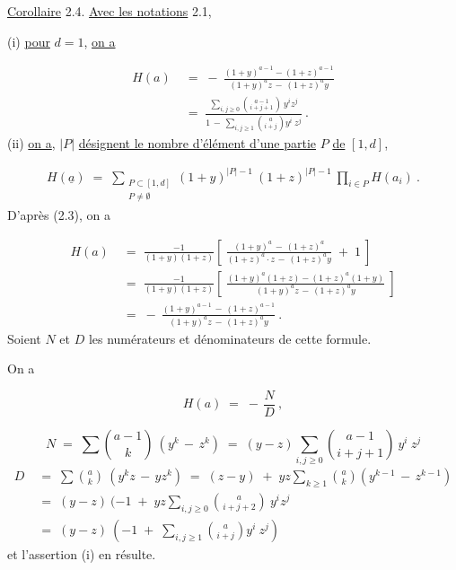 
\underline{Corollaire} 2.4. \underline{Avec les notations} 2.1,

(i) \quad \underline{pour} $d = 1$, \underline{on a}

\begin{equation*}
\begin{aligned}
H(a) \;&=\; -\ \frac{(1+y)^{a-1} - (1+z)^{a-1}}{(1+y)^{a}z \,-\, (1+z)^{a}y}\\[2ex]
&=\; \frac{\displaystyle\sum_{i,j\geq 0}\binom{a-1}{i+j+1}\ y^{i}z^{j}}{1 \,-\, \displaystyle\sum_{i,j\geq 1}\binom{a}{i+j}y^{i}\ z^{j}}\ .
\end{aligned}
\end{equation*}
(ii) \quad \underline{on a}, $|P|$ \underline{désignent le nombre d'élément d'une partie} $P$ \underline{de} $[1,d]$,

\begin{multline*}
H(\underline{a}) \;=\; \sum_{\substack{P \subset [1,d] \\ P \neq \emptyset}} (1+y)^{|P|-1}\ (1+z)^{|P|-1}\ \prod_{i \in P} H(a_{i})\ .
\end{multline*}
D'après (2.3), on a

\begin{equation*}
\begin{aligned}
H(a) \;&=\; \frac{-1}{(1+y)(1+z)}\left[\ \frac{(1+y)^{a} \,-\, (1+z)^{a}}{(1+z)^{a}\cdot z \,-\, (1+z)^{a}y} \;+\; 1\ \right]\\[2ex]
&=\; \frac{-1}{(1+y)(1+z)}\left[\ \frac{(1+y)^{a}(1+z)-(1+z)^{a}(1+y)}{(1+y)^{a}z \,-\, (1+z)^{a}y}\ \right]\\[2ex]
&=\; -\ \frac{(1+y)^{a-1} \,-\, (1+z)^{a-1}}{(1+y)^{a}z \,-\, (1+z)^{a}y}\ .
\end{aligned}
\end{equation*}
Soient $N$ et $D$ les numérateurs et dénominateurs de cette formule.

On a

\begin{equation*}
H(a) \;=\; -\,\frac{N}{D}\ , 
\end{equation*}


\begin{equation*}
 N \;=\; \sum \binom{a-1}{k}\ (y^{k} \,-\, z^{k}) \;=\; (y-z) \sum_{i,j\geq 0}\binom{a-1}{i+j+1}\ y^{i}\ z^{j}
\end{equation*}
\begin{equation*}
\begin{aligned}
D \;&=\; \sum \binom{a}{k}\ (y^{k}z \,-\, yz^{k}) \;=\; (z-y) \;+\; yz \sum_{k\geq 1}\binom{a}{k}\!\left(y^{k-1} \,-\, z^{k-1}\right)\\[2ex]
&=\; (y-z)\ (-1 \;+\; yz \sum_{i,j\geq 0}\binom{a}{i+j+2}\ y^{i}z^{j}\\[2ex]
&=\; (y-z)\ (-1 \;+\; \sum_{i,j\geq 1}\binom{a}{i+j}y^{i}\ z^{j})
\end{aligned}
\end{equation*}
et l'assertion (i) en résulte.

